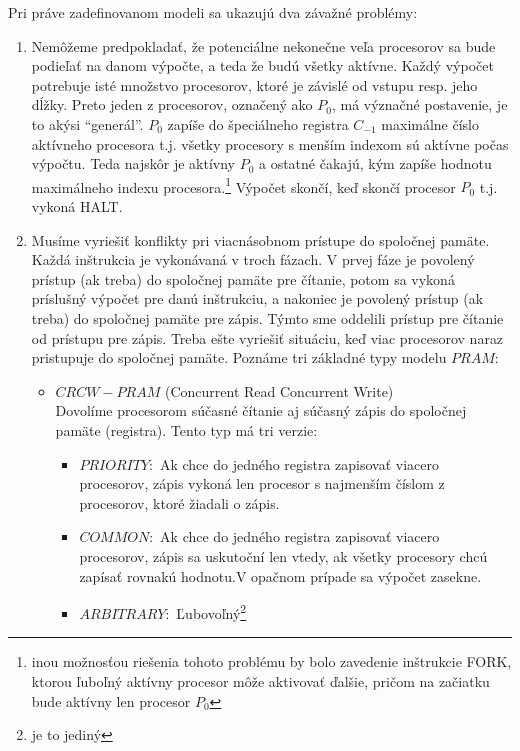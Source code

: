 \smallskip

Pri práve zadefinovanom modeli sa ukazujú dva závažné problémy:
\begin{enumerate}
  \item Nemôžeme predpokladať, že potenciálne nekonečne veľa
  procesorov sa bude podieľať na danom výpočte, a teda že budú
  všetky aktívne. Každý výpočet potrebuje isté množstvo
  procesorov, ktoré je závislé od vstupu resp. jeho dĺžky. Preto
  jeden z procesorov, označený ako $P_0$, má význačné postavenie,
  je to akýsi ``generál''. $P_0$ zapíše do špeciálneho registra $C_{-1}$
  maximálne číslo aktívneho procesora t.j. všetky procesory s
  menším indexom sú aktívne počas výpočtu. Teda najskôr je aktívny
  $P_0$ a ostatné čakajú, kým zapíše hodnotu maximálneho indexu
  procesora.\footnote{inou možnosťou riešenia tohoto problému by
  bolo zavedenie inštrukcie FORK, ktorou ľuboľný aktívny procesor môže
  aktivovať ďalšie, pričom na začiatku bude aktívny len procesor
  $P_0$}
  Výpočet skončí, keď skončí procesor $P_0$ t.j. vykoná HALT.
  \item Musíme vyriešiť konflikty pri viacnásobnom prístupe do
  spoločnej pamäte. Každá inštrukcia je vykonávaná v troch fázach.
  V prvej fáze je povolený prístup (ak treba) do spoločnej pamäte
  pre čítanie, potom sa vykoná príslušný výpočet pre danú
  inštrukciu, a nakoniec je povolený prístup (ak treba) do
  spoločnej pamäte pre zápis. Týmto sme oddelili prístup pre
  čítanie od prístupu pre zápis. Treba ešte vyriešiť situáciu, keď
  viac procesorov naraz pristupuje do spoločnej pamäte. Poznáme
  tri základné typy modelu $PRAM$:
  \begin{itemize}
    \item $CRCW-PRAM$ (Concurrent Read Concurrent Write) \\ Dovolíme
    procesorom súčasné čítanie aj súčasný zápis do spoločnej
    pamäte (registra). Tento typ má tri verzie:
    \begin{itemize}
      \item $PRIORITY:$ Ak chce do jedného registra zapisovať
      viacero procesorov, zápis vykoná len procesor s najmenším
      číslom z procesorov, ktoré žiadali o zápis.
      \item $COMMON:$ Ak chce do jedného registra zapisovať viacero
      procesorov, zápis sa uskutoční len vtedy, ak všetky
      procesory chcú zapísať rovnakú hodnotu.\newline V opačnom prípade sa
      výpočet zasekne.
      \item $ARBITRARY:$ Ľubovoľný\footnote{je to jediný
}
\end{itemize}
\end{itemize}
\end{enumerate}
